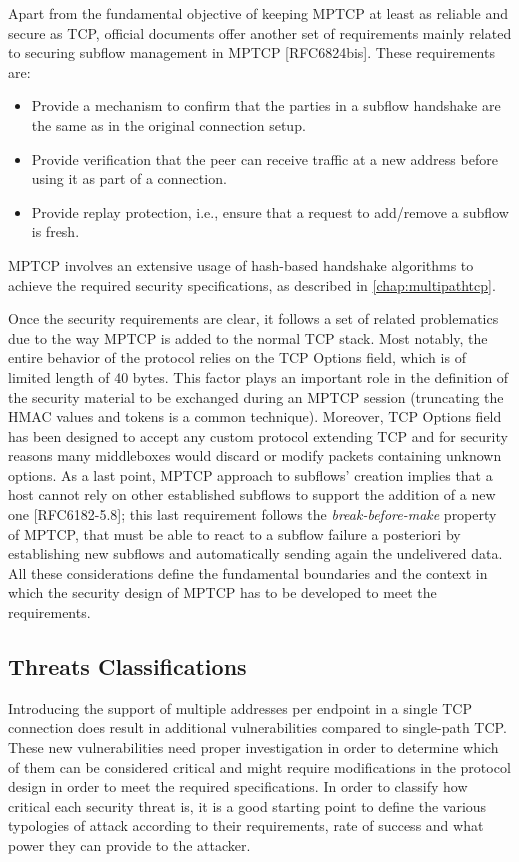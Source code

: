 \vspace{5mm} %
Apart from the fundamental objective of keeping MPTCP at least as reliable and secure as TCP, official documents offer another set of requirements mainly related to securing subflow management in MPTCP [RFC6824bis]. These requirements are:
\begin{itemize} 
\item Provide a mechanism to confirm that the parties in a subflow handshake are the same as in the original connection setup.

\item Provide verification that the peer can receive traffic at a new address before using it as part of a connection.

\item Provide replay protection, i.e., ensure that a request to add/remove a subflow is fresh.
\end{itemize}

MPTCP involves an extensive usage of hash-based handshake algorithms to achieve the required security specifications, as described in \autoref{chap:multipathtcp}. 


Once the security requirements are clear, it follows a set of related problematics due to the way MPTCP is added to the normal TCP stack. Most notably, the entire behavior of the protocol relies on the TCP Options field, which is of limited length of 40 bytes. This factor plays an important role in the definition of the security material to be exchanged during an MPTCP session (truncating the HMAC values and tokens is a common technique). Moreover, TCP Options field has been designed to accept any custom protocol extending TCP and for security reasons many middleboxes would discard or modify packets containing unknown options. As a last point, MPTCP approach to subflows' creation implies that a host cannot rely on other established subflows to support the addition of a new one [RFC6182-5.8]; this last requirement follows the \textit{break-before-make} property of MPTCP, that must be able to react to a subflow failure a posteriori by establishing new subflows and automatically sending again the undelivered data. All these considerations define the fundamental boundaries and the context in which the security design of MPTCP has to be developed to meet the requirements.

\subsection{Threats Classifications}
Introducing the support of multiple addresses per endpoint in a single TCP connection does result in additional vulnerabilities compared to single-path TCP. These new vulnerabilities need proper investigation in order to determine which of them can be considered critical and might require modifications in the protocol design in order to meet the required specifications. In order to classify how critical each security threat is, it is a good starting point to define the various typologies of attack according to their requirements, rate of success and what power they can provide to the attacker.

